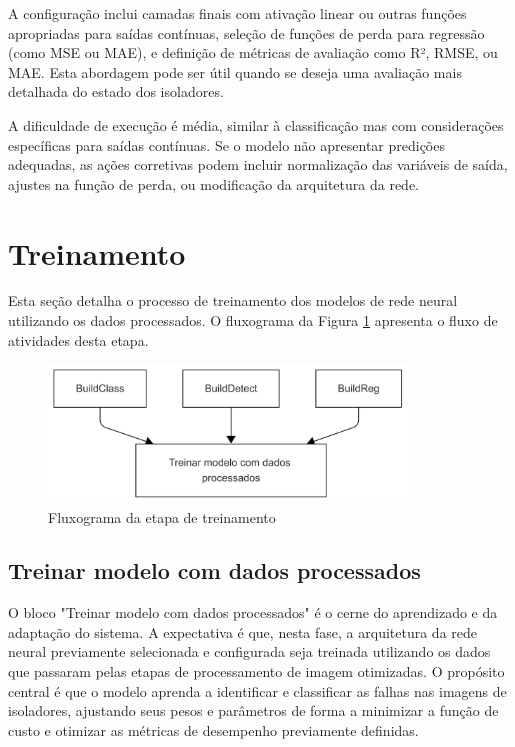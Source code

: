 A configuração inclui camadas finais com ativação linear ou outras funções apropriadas para saídas contínuas, seleção de funções de perda para regressão (como MSE ou MAE), e definição de métricas de avaliação como R², RMSE, ou MAE. Esta abordagem pode ser útil quando se deseja uma avaliação mais detalhada do estado dos isoladores.

A dificuldade de execução é média, similar à classificação mas com considerações específicas para saídas contínuas. Se o modelo não apresentar predições adequadas, as ações corretivas podem incluir normalização das variáveis de saída, ajustes na função de perda, ou modificação da arquitetura da rede.

\section{Treinamento}

Esta seção detalha o processo de treinamento dos modelos de rede neural utilizando os dados processados. O fluxograma da Figura \ref{fig:fluxograma_treinamento} apresenta o fluxo de atividades desta etapa.

\begin{figure}[H]
    \centering
    \caption{\label{fig:fluxograma_treinamento}Fluxograma da etapa de treinamento}
    \includegraphics[width=0.85\textwidth]{img/metodologia - 5 - treinamento.png}
\end{figure}

\subsection{Treinar modelo com dados processados}
O bloco "Treinar modelo com dados processados" é o cerne do aprendizado e da adaptação do sistema. A expectativa é que, nesta fase, a arquitetura da rede neural previamente selecionada e configurada seja treinada utilizando os dados que passaram pelas etapas de processamento de imagem otimizadas. O propósito central é que o modelo aprenda a identificar e classificar as falhas nas imagens de isoladores, ajustando seus pesos e parâmetros de forma a minimizar a função de custo e otimizar as métricas de desempenho previamente definidas.

